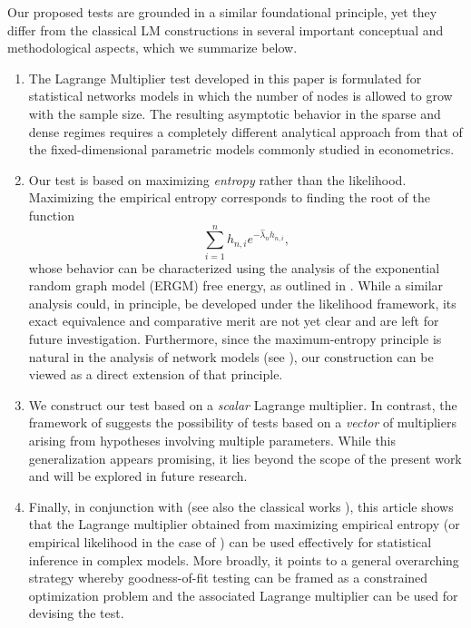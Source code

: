 \documentclass[12pt]{article}
\numberwithin{equation}{section}
\begin{document}
Our proposed tests are grounded in a similar foundational principle, yet they differ from the classical LM constructions in several important conceptual and methodological aspects, which we summarize below.
\begin{enumerate}
    \item The Lagrange Multiplier test developed in this paper is formulated for statistical networks models in which the number of nodes is allowed to grow with the sample size. The resulting asymptotic behavior in the sparse and dense regimes requires a completely different analytical approach from that of the fixed-dimensional parametric models commonly studied in econometrics.
    
    \item Our test is based on maximizing \emph{ entropy} rather than the likelihood. Maximizing the  empirical entropy corresponds to finding the root of the function 
    \[
    \sum_{i=1}^n h_{n,i} e^{-\hat{\lambda}_n h_{n,i}},
    \]
    whose behavior can be characterized using the analysis of the exponential random graph model (ERGM) free energy, as outlined in \cite{chatterjee2013estimating}. While a similar analysis could, in principle, be developed under the likelihood framework, its exact equivalence and comparative merit are not yet clear and are left for future investigation. Furthermore, since the maximum-entropy principle is natural in the analysis of network models (see \cite{squartini2017maximum}), our construction can be viewed as a direct extension of that principle.
    
    \item We construct our test based on a \emph{scalar} Lagrange multiplier. In contrast, the framework of \cite{silvey1958} suggests the possibility of tests based on a \emph{vector} of multipliers arising from hypotheses involving multiple parameters. While this generalization appears promising, it lies beyond the scope of the present work and will be explored in future research.
    \item Finally, in conjunction with \cite{ghosh2023} (see also the classical works \cite{silvey1958,silvey1959}), this article shows that the Lagrange multiplier obtained from maximizing empirical entropy (or empirical likelihood in the case of \cite{ghosh2023}) can be used effectively for statistical inference in complex models. More broadly, it points to a general overarching strategy whereby goodness-of-fit testing can be framed as a constrained optimization problem and the associated Lagrange multiplier can be used for devising the test.
\end{enumerate}
\end{document}

